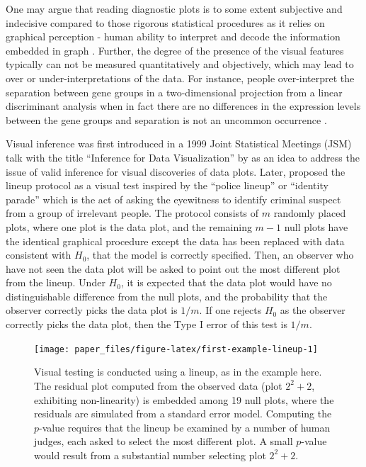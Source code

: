 \documentclass[]{interact}
\theoremstyle{plain}%
\theoremstyle{definition}
\theoremstyle{remark}
\begin{document}
One may argue that reading diagnostic plots is to some extent subjective
and indecisive compared to those rigorous statistical procedures as it
relies on graphical perception - human ability to interpret and decode
the information embedded in graph \citep{cleveland_graphical_1984}.
Further, the degree of the presence of the visual features typically can
not be measured quantitatively and objectively, which may lead to over
or under-interpretations of the data. For instance, people
over-interpret the separation between gene groups in a two-dimensional
projection from a linear discriminant analysis when in fact there are no
differences in the expression levels between the gene groups and
separation is not an uncommon occurrence
\citep{roy_chowdhury_using_2015}.

Visual inference was first introduced in a 1999 Joint Statistical
Meetings (JSM) talk with the title ``Inference for Data Visualization''
by \citet{buja_inference_1999} as an idea to address the issue of valid
inference for visual discoveries of data plots. Later,
\citet{buja_statistical_2009} proposed the lineup protocol as a visual
test inspired by the ``police lineup'' or ``identity parade'' which is
the act of asking the eyewitness to identify criminal suspect from a
group of irrelevant people. The protocol consists of \(m\) randomly
placed plots, where one plot is the data plot, and the remaining
\(m - 1\) null plots have the identical graphical procedure except the
data has been replaced with data consistent with \(H_0\), that the model
is correctly specified. Then, an observer who have not seen the data
plot will be asked to point out the most different plot from the lineup.
Under \(H_0\), it is expected that the data plot would have no
distinguishable difference from the null plots, and the probability that
the observer correctly picks the data plot is \(1/m\). If one rejects
\(H_0\) as the observer correctly picks the data plot, then the Type I
error of this test is \(1/m\).

\begin{figure}

{\centering \texttt{[image: paper\_files/figure-latex/first-example-lineup-1]} 

}

\caption{Visual testing is conducted using a lineup, as in the example here. The residual plot computed from the observed data (plot $2^2 + 2$, exhibiting non-linearity) is embedded among 19 null plots, where the residuals are simulated from a standard error model. Computing the $p$-value requires that the lineup be examined by a number of human judges, each asked to select the most different plot. A small $p$-value would result from a substantial number selecting plot $2^2 + 2$.}\label{fig:first-example-lineup}
\end{figure}
\end{document}
